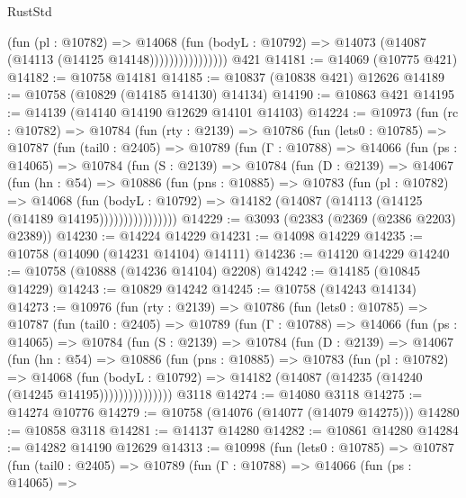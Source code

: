 \begin{lexlean}{RustStd}
\begin{coremodule}
                          (fun (pl : @10782) =>
                          @14068
                            (fun (bodyL : @10792) =>
                            @14073 (@14087 (@14113 (@14125 @14148))))))))))))))))
    @421
@14181 := @14069 (@10775 @421)
@14182 := @10758 @14181
@14185 := @10837 (@10838 @421) @12626
@14189 := @10758 (@10829 (@14185 @14130) @14134)
@14190 := @10863 @421
@14195 := @14139 (@14140 @14190 @12629 @14101 @14103)
@14224 := @10973
    (fun (rc : @10782) =>
    @10784
      (fun (rty : @2139) =>
      @10786
        (fun (lets0 : @10785) =>
        @10787
          (fun (tail0 : @2405) =>
          @10789
            (fun (Γ : @10788) =>
            @14066
              (fun (ps : @14065) =>
              @10784
                (fun (S : @2139) =>
                @10784
                  (fun (D : @2139) =>
                  @14067
                    (fun (hn : @54) =>
                    @10886
                      (fun (pns : @10885) =>
                      @10783
                        (fun (pl : @10782) =>
                        @14068
                          (fun (bodyL : @10792) =>
                          @14182 (@14087 (@14113 (@14125 (@14189 @14195))))))))))))))))
@14229 := @3093 (@2383 (@2369 (@2386 @2203) @2389))
@14230 := @14224 @14229
@14231 := @14098 @14229
@14235 := @10758 (@14090 (@14231 @14104) @14111)
@14236 := @14120 @14229
@14240 := @10758 (@10888 (@14236 @14104) @2208)
@14242 := @14185 (@10845 @14229)
@14243 := @10829 @14242
@14245 := @10758 (@14243 @14134)
@14273 := @10976
    (fun (rty : @2139) =>
    @10786
      (fun (lets0 : @10785) =>
      @10787
        (fun (tail0 : @2405) =>
        @10789
          (fun (Γ : @10788) =>
          @14066
            (fun (ps : @14065) =>
            @10784
              (fun (S : @2139) =>
              @10784
                (fun (D : @2139) =>
                @14067
                  (fun (hn : @54) =>
                  @10886
                    (fun (pns : @10885) =>
                    @10783
                      (fun (pl : @10782) =>
                      @14068
                        (fun (bodyL : @10792) =>
                        @14182 (@14087 (@14235 (@14240 (@14245 @14195)))))))))))))))
    @3118
@14274 := @14080 @3118
@14275 := @14274 @10776
@14279 := @10758 (@14076 (@14077 (@14079 @14275)))
@14280 := @10858 @3118
@14281 := @14137 @14280
@14282 := @10861 @14280
@14284 := @14282 @14190 @12629
@14313 := @10998
    (fun (lets0 : @10785) =>
    @10787
      (fun (tail0 : @2405) =>
      @10789
        (fun (Γ : @10788) =>
        @14066
          (fun (ps : @14065) =>

\end{coremodule}
\end{lexlean}
